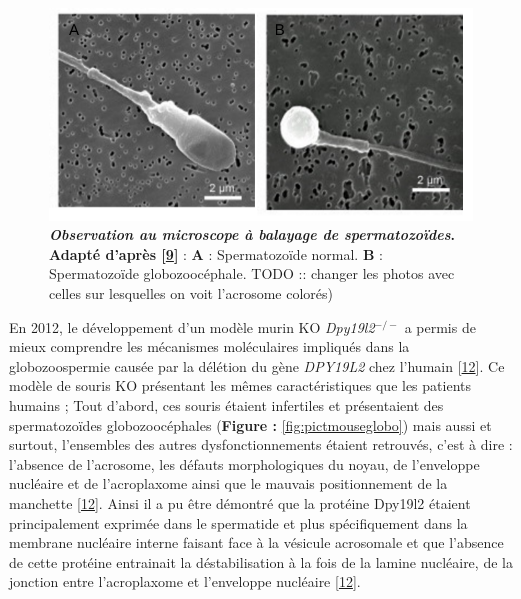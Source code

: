 \documentclass[12pt,twoside]{ugathesis}
\begin{document}
\begin{figure}

{\centering \includegraphics[scale=0.6]{figure/globo_normal_spz} 

}

\caption[Observation au microscope à balayage de spermatozoïdes]{\textbf{\emph{Observation au microscope à balayage de
spermatozoïdes}. Adapté d'après
{[}\protect\hyperlink{ref-Harbuz2011}{9}{]}} : \textbf{A} :
Spermatozoïde normal. \textbf{B} : Spermatozoïde globozoocéphale. TODO
:: changer les photos avec celles sur lesquelles on voit l'acrosome
colorés)}\label{fig:pictglobospz}
\end{figure}








En 2012, le développement d'un modèle murin KO \emph{Dpy19l2}\(^{-/-}\)
a permis de mieux comprendre les mécanismes moléculaires impliqués dans
la globozoospermie causée par la délétion du gène \emph{DPY19L2} chez
l'humain {[}\protect\hyperlink{ref-Pierre2012}{12}{]}. Ce modèle de
souris KO présentant les mêmes caractéristiques que les patients humains
; Tout d'abord, ces souris étaient infertiles et présentaient des
spermatozoïdes globozoocéphales (\textbf{Figure :
}\ref{fig:pictmouseglobo}) mais aussi et surtout, l'ensembles des autres
dysfonctionnements étaient retrouvés, c'est à dire : l'absence de
l'acrosome, les défauts morphologiques du noyau, de l'enveloppe
nucléaire et de l'acroplaxome ainsi que le mauvais positionnement de la
manchette {[}\protect\hyperlink{ref-Pierre2012}{12}{]}. Ainsi il a pu
être démontré que la protéine Dpy19l2 étaient principalement exprimée
dans le spermatide et plus spécifiquement dans la membrane nucléaire
interne faisant face à la vésicule acrosomale et que l'absence de cette
protéine entrainait la déstabilisation à la fois de la lamine nucléaire,
de la jonction entre l'acroplaxome et l'enveloppe nucléaire
{[}\protect\hyperlink{ref-Pierre2012}{12}{]}.
\end{document}
